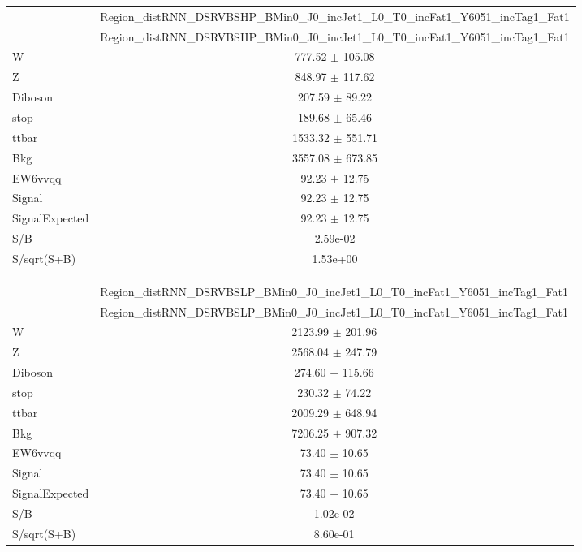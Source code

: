 \documentclass{article}
\begin{document}
\begin{table}
\centering
\small
\begin{tabular}{l|c|}
\cline{2-2}
 & \multicolumn{1}{c|}{Region\_distRNN\_DSRVBSHP\_BMin0\_J0\_incJet1\_L0\_T0\_incFat1\_Y6051\_incTag1\_Fat1}\\
\cline{2-2}
 & \multicolumn{1}{c|}{Region\_distRNN\_DSRVBSHP\_BMin0\_J0\_incJet1\_L0\_T0\_incFat1\_Y6051\_incTag1\_Fat1}\\ \hline
W & 777.52 $\pm$ 105.08\\
Z & 848.97 $\pm$ 117.62\\
Diboson & 207.59 $\pm$ 89.22\\
stop & 189.68 $\pm$ 65.46\\
ttbar & 1533.32 $\pm$ 551.71\\
\hline
Bkg & 3557.08 $\pm$ 673.85\\
\hline
EW6vvqq & 92.23 $\pm$ 12.75\\
\hline
Signal & 92.23 $\pm$ 12.75\\
SignalExpected & 92.23 $\pm$ 12.75\\
\hline
S/B & 2.59e-02\\
S/sqrt(S+B) & 1.53e+00\\
\end{tabular}
\end{table}


\begin{table}
\centering
\small
\begin{tabular}{l|c|}
\cline{2-2}
 & \multicolumn{1}{c|}{Region\_distRNN\_DSRVBSLP\_BMin0\_J0\_incJet1\_L0\_T0\_incFat1\_Y6051\_incTag1\_Fat1}\\
\cline{2-2}
 & \multicolumn{1}{c|}{Region\_distRNN\_DSRVBSLP\_BMin0\_J0\_incJet1\_L0\_T0\_incFat1\_Y6051\_incTag1\_Fat1}\\ \hline
W & 2123.99 $\pm$ 201.96\\
Z & 2568.04 $\pm$ 247.79\\
Diboson & 274.60 $\pm$ 115.66\\
stop & 230.32 $\pm$ 74.22\\
ttbar & 2009.29 $\pm$ 648.94\\
\hline
Bkg & 7206.25 $\pm$ 907.32\\
\hline
EW6vvqq & 73.40 $\pm$ 10.65\\
\hline
Signal & 73.40 $\pm$ 10.65\\
SignalExpected & 73.40 $\pm$ 10.65\\
\hline
S/B & 1.02e-02\\
S/sqrt(S+B) & 8.60e-01\\
\end{tabular}
\end{table}
\end{document}
